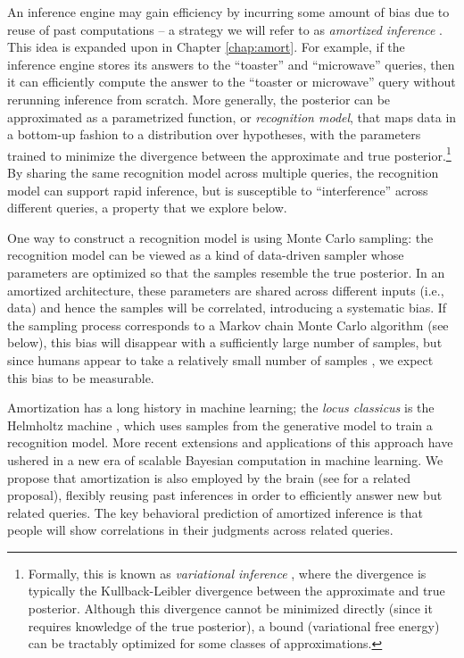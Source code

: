 An inference engine may gain efficiency by incurring some amount of bias due to reuse of past computations -- a strategy we will refer to as \emph{amortized inference} \citep{stuhlmuller2013learning, gershman2014amortized}. This idea is expanded upon in Chapter \ref{chap:amort}. For example, if the inference engine stores its answers to the ``toaster'' and ``microwave'' queries, then it can efficiently compute the answer to the ``toaster or microwave'' query without rerunning inference from scratch. More generally, the posterior can be approximated as a parametrized function, or \emph{recognition model}, that maps data in a bottom-up fashion to a distribution over hypotheses, with the parameters trained to minimize the divergence between the approximate and true posterior.\footnote{Formally, this is known as \emph{variational inference} \citep{jordan1999introduction}, where the divergence is typically the Kullback-Leibler divergence between the approximate and true posterior. Although this divergence cannot be minimized directly (since it requires knowledge of the true posterior), a bound (variational free energy) can be tractably optimized for some classes of approximations.} By sharing the same recognition model across multiple queries, the recognition model can support rapid inference, but is susceptible to ``interference'' across different queries, a property that we explore below.

One way to construct a recognition model is using Monte Carlo sampling: the recognition model can be viewed as a kind of data-driven sampler whose parameters are optimized so that the samples resemble the true posterior. In an amortized architecture, these parameters are shared across different inputs (i.e., data) and hence the samples will be correlated, introducing a systematic bias. If the sampling process corresponds to a Markov chain Monte Carlo algorithm (see below), this bias will disappear with a sufficiently large number of samples, but since humans appear to take a relatively small number of samples \citep{dasgupta2017hypotheses,vul2014one}, we expect this bias to be measurable.

Amortization has a long history in machine learning; the \emph{locus classicus} is the Helmholtz machine \citep{dayan1995helmholtz,hinton1995wake}, which uses samples from the generative model to train a recognition model. More recent extensions and applications of this approach \citep{rezende2014stochastic,paige2016inference,kingma2013auto,ritchie2016neurally} have ushered in a new era of scalable Bayesian computation in machine learning. We propose that amortization is also employed by the brain (see \citet{yildirim2015efficient} for a related proposal), flexibly reusing past inferences in order to efficiently answer new but related queries. The key behavioral prediction of amortized inference is that people will show correlations in their judgments across related queries. 

